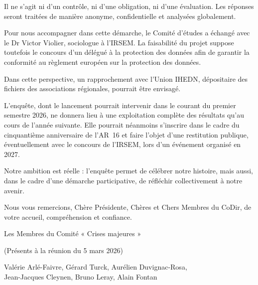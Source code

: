 \documentclass[12pt,a4paper]{article}
\begin{document}
\begin{tcolorbox}[
breakable,
colback=gray!5,
colframe=black,
boxrule=0.5pt,
arc=3mm
]
Il ne s'agit ni d'un contrôle, ni d'une obligation, ni d'une évaluation. Les réponses seront traitées de manière anonyme, confidentielle et analysées globalement.

Pour nous accompagner dans cette démarche, le Comité d'études a échangé avec le Dr Victor Violier, sociologue à l'IRSEM. La faisabilité du projet suppose toutefois le concours d'un délégué à la protection des données afin de garantir la conformité au règlement européen sur la protection des données.

Dans cette perspective, un rapprochement avec l'Union IHEDN, dépositaire des fichiers des associations régionales, pourrait être envisagé.

L'enquête, dont le lancement pourrait intervenir dans le courant du premier semestre 2026, ne donnera lieu à une exploitation complète des résultats qu'au cours de l'année suivante. Elle pourrait néanmoins s'inscrire dans le cadre du cinquantième anniversaire de l'AR~16 et faire l'objet d'une restitution publique, éventuellement avec le concours de l'IRSEM, lors d'un événement organisé en 2027.

Notre ambition est réelle : l'enquête permet de célébrer notre histoire, mais aussi, dans le cadre d'une démarche participative, de réfléchir collectivement à notre avenir.

Nous vous remercions, Chère Présidente, Chères et Chers Membres du CoDir, de votre accueil, compréhension et confiance.

\begin{flushright}
Les Membres du Comité « Crises majeures »

(Présents à la réunion du 5 mars 2026)

Valérie Arlé-Faivre, Gérard Turck, Aurélien Duvignac-Rosa,\\
Jean-Jacques Cleynen, Bruno Leray, Alain Fontan
\end{flushright}

\end{tcolorbox}





\end{document}
